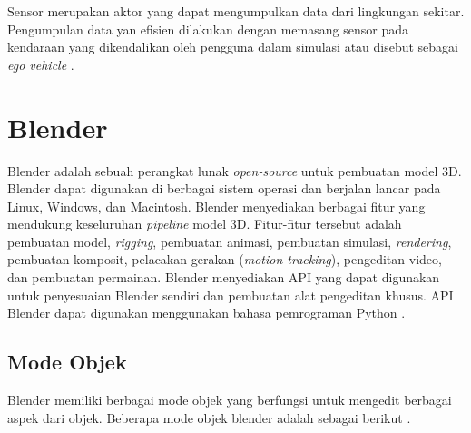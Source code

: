 
Sensor merupakan aktor yang dapat mengumpulkan data dari lingkungan sekitar.
Pengumpulan data yan efisien dilakukan dengan memasang sensor pada kendaraan
yang dikendalikan oleh pengguna dalam simulasi atau disebut sebagai \textit{ego
vehicle} \parencite{carla-documentation-core-concepts,
carla-documentation-core-retrieve-simulation-data}.



\section{Blender}

Blender adalah sebuah perangkat lunak \textit{open-source} untuk pembuatan model
3D. Blender dapat digunakan di berbagai sistem operasi dan berjalan lancar pada
Linux, Windows, dan Macintosh. Blender menyediakan berbagai fitur yang mendukung
keseluruhan \textit{pipeline} model 3D. Fitur-fitur tersebut adalah pembuatan
model, \textit{rigging}, pembuatan animasi, pembuatan simulasi,
\textit{rendering}, pembuatan komposit, pelacakan gerakan (\textit{motion
tracking}), pengeditan video, dan pembuatan permainan. Blender menyediakan API
yang dapat digunakan untuk penyesuaian Blender sendiri dan pembuatan alat
pengeditan khusus. API Blender dapat digunakan menggunakan bahasa pemrograman
Python \parencite{blender-about}.

\subsection{Mode Objek}

Blender memiliki berbagai mode objek yang berfungsi untuk mengedit berbagai
aspek dari objek. Beberapa mode objek blender adalah sebagai berikut
\parencite{blender-object-modes}.

